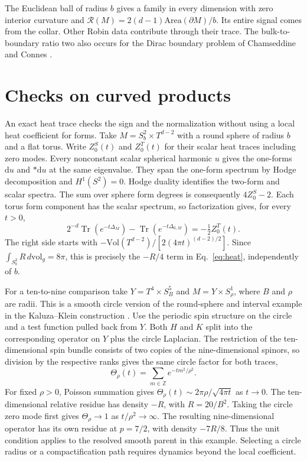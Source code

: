 \documentclass[aps,prd,reprint,onecolumn,nofootinbib,amsmath,amssymb]{revtex4-2}
\newcommand{\Tr}{\operatorname{Tr}}
\newcommand{\dv}{\,d\mathrm{vol}_g}
\begin{document}
The Euclidean ball of radius \(b\) gives a family in every dimension
with zero interior curvature and
\(\mathcal R(M)=2(d-1)\mathrm{Area}(\partial M)/b\). Its entire signal
comes from the collar. Other Robin data contribute through their trace.
The bulk-to-boundary ratio two also occurs for the Dirac boundary
problem of Chamseddine and Connes \cite{ChamseddineConnesBoundary2007}.

\section{Checks on curved products}

An exact heat trace checks the sign and the normalization without using a
local heat coefficient for forms. Take \(M=S^2_b\times T^{d-2}\) with a
round sphere of radius \(b\) and a flat torus. Write \(Z_0^S(t)\) and
\(Z_0^T(t)\) for their scalar heat traces including zero modes.
Every nonconstant scalar spherical harmonic \(u\) gives the one-forms
\(\mathrm du\) and \(*\mathrm du\) at the same eigenvalue. They span the
one-form spectrum by Hodge decomposition and \(H^1(S^2)=0\).
Hodge duality identifies the two-form and scalar spectra. The sum over
sphere form degrees is consequently \(4Z_0^S-2\). Each torus form
component has the scalar spectrum, so factorization gives, for every
\(t>0\),
\begin{equation}
 2^{-d}\Tr(e^{-t\Delta_M})-\Tr(e^{-t\Delta_{0,M}})
 =-\tfrac12 Z_0^T(t).
 \label{eq:sphere}
\end{equation}
The right side starts with \(-\mathrm{Vol}(T^{d-2})/
[2(4\pi t)^{(d-2)/2}]\).
Since \(\int_{S^2_b}R\dv=8\pi\), this is precisely the \(-R/4\) term
in Eq.~\eqref{eq:heat}, independently of \(b\).

For a ten-to-nine comparison take \(Y=T^4\times S^5_B\) and
\(M=Y\times S^1_\rho\), where \(B\) and \(\rho\) are radii. This is a
smooth circle version of the round-sphere and interval example in the
Kaluza--Klein construction \cite{TwoEndpoint2026}. Use the periodic spin
structure on the circle and a test function pulled back from \(Y\).
Both \(H\) and \(K\) split into the corresponding operator on \(Y\) plus
the circle Laplacian. The restriction of the ten-dimensional spin
bundle consists of two copies of the nine-dimensional spinors, so division
by the respective ranks gives the same circle factor for both traces,
\begin{equation}
 \Theta_\rho(t)=\sum_{m\in\mathbb Z}e^{-tm^2/\rho^2}.
\end{equation}
For fixed \(\rho>0\), Poisson summation gives
\(\Theta_\rho(t)\sim 2\pi\rho/\sqrt{4\pi t}\) as \(t\to0\).
The ten-dimensional relative residue has density \(-R\), with
\(R=20/B^2\). Taking the circle zero mode first gives
\(\Theta_\rho\to1\) as \(t/\rho^2\to\infty\). The resulting
nine-dimensional operator has its own residue at \(p=7/2\), with density
\(-7R/8\). Thus the unit condition applies to the resolved smooth parent
in this example. Selecting a circle radius or a compactification path
requires dynamics beyond the local coefficient.
\end{document}
